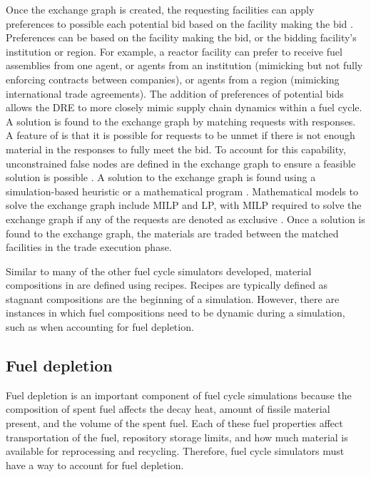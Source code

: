 Once the exchange graph is created, the requesting facilities can apply 
preferences to possible each potential bid based on the facility 
making the bid \cite{huff_fundamental_2016}. Preferences can be based on 
the facility making the bid, or the bidding facility's institution or 
region. For example, a reactor facility can prefer to receive fuel 
assemblies from one agent, or agents from an institution (mimicking but not 
fully enforcing contracts between companies), or agents from a region 
(mimicking international trade agreements). The addition of preferences of 
potential bids allows the \gls{DRE} to more closely mimic supply chain 
dynamics within a fuel cycle. 
A solution is found to the exchange graph by matching requests with 
responses. A feature of \Cyclus is that it is possible for 
requests to be unmet if there is not enough material in the responses 
to fully meet the bid. To account for this 
capability, unconstrained false nodes are defined in the exchange graph
to ensure a feasible solution is possible \cite{gidden_methodology_2016}.
A solution to the exchange graph is found using a simulation-based 
heuristic or a mathematical program \cite{gidden_agent-based_2015}.
Mathematical models to solve the exchange graph include \gls{MILP} and 
\gls{LP}, with \gls{MILP} required to solve the exchange graph if 
any of the requests are denoted as exclusive \cite{huff_fundamental_2016}.
Once a solution is found to the exchange graph, the materials are 
traded between the matched facilities in the trade execution phase.  

Similar to many of the other fuel cycle simulators developed, material 
compositions in \Cyclus are defined using recipes. Recipes are 
typically defined as stagnant compositions are the beginning of 
a simulation. However, there are instances in which fuel compositions 
need to be dynamic during a simulation, such as when accounting for fuel 
depletion. 

\subsection{Fuel depletion}
Fuel depletion is an important component of fuel cycle simulations 
because the composition of spent fuel affects the decay heat, 
amount of fissile material present, and the volume of the spent 
fuel. Each of these fuel properties affect transportation of the fuel, 
repository storage limits, and how much material is available for 
reprocessing and recycling. Therefore, fuel cycle simulators must 
have a way to account for fuel depletion. 

